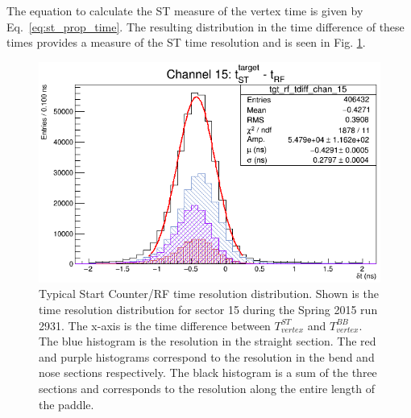 The equation to calculate the ST measure of the vertex time is given by Eq.~\ref{eq:st_prop_time}.  
The resulting distribution in the time difference of these times provides a measure of the ST time resolution and is seen in Fig. \ref{fig:beam_tof_corr_chan_15}.
	\begin{figure}[!htb]
		\centering
		\includegraphics[width=0.7\linewidth]{performance/figs/beam_tof_corr_chan_15}
		\caption[Typical Start Counter/RF time resolution distribution]{Typical Start Counter/RF time resolution distribution.  Shown is the time resolution distribution for sector 15 during the Spring 2015 run 2931. The x-axis is the time difference between $T^{ST}_{vertex}$ and $T^{BB}_{vertex}$. The blue histogram is the resolution in the straight section. The red and purple histograms correspond to the resolution in the bend and nose sections respectively. The black histogram is a sum of the three sections and corresponds to the resolution along the entire length of the paddle.}
		\label{fig:beam_tof_corr_chan_15}
	\end{figure}

